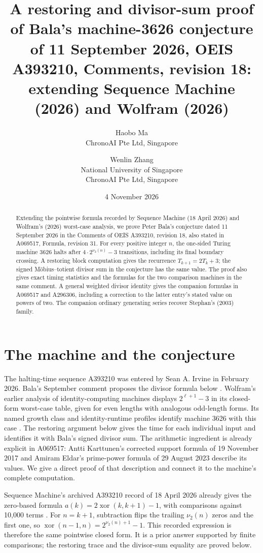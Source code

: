 \documentclass[11pt]{article}
\title{A restoring and divisor-sum proof of Bala's\newline
  machine-3626 conjecture of 11 September 2026,\newline
  OEIS A393210, Comments, revision 18:\newline
  extending Sequence Machine (2026) and Wolfram (2026)}
\author{Haobo Ma\\\small ChronoAI Pte Ltd, Singapore
  \and Wenlin Zhang\\\small National University of Singapore\\
  \small ChronoAI Pte Ltd, Singapore}
\date{4 November 2026}
\newcommand{\val}{\nu_2}
\begin{document}
\maketitle
\begin{abstract}
Extending the pointwise formula recorded by Sequence Machine (18 April 2026)
and Wolfram's (2026) worst-case analysis, we prove Peter Bala's conjecture
dated 11 September 2026 in the Comments
of OEIS A393210, revision 18, also stated in A069517, Formula, revision 31.
For every positive integer $n$, the one-sided Turing machine 3626 halts after
$4\cdot2^{\val(n)}-3$ transitions, including its final boundary crossing.
A restoring block computation gives the recurrence $T_{k+1}=2T_k+3$;
the signed M\"obius--totient divisor sum in the conjecture has the same value.
The proof also gives exact timing statistics and the formulas for the two
comparison machines in the same comment. A general weighted divisor identity
gives the companion formulas in A069517 and A296306, including a correction
to the latter entry's stated value on powers of two.
The companion ordinary generating series recover Stephan's (2003) family.
\end{abstract}

\section{The machine and the conjecture}
The halting-time sequence A393210 was entered by Sean A. Irvine in February
2026. Bala's September comment proposes the divisor formula below
\cite{halting,mobius}. Wolfram's earlier analysis of identity-computing
machines displays $2^{\ell+1}-3$ in its closed-form worst-case table,
given for even lengths with analogous odd-length forms. Its named growth
class and identity-runtime profiles identify machine 3626 with this case
\cite{wolfram}.
The restoring argument below gives the time for each individual input and
identifies it with Bala's signed divisor sum.
The arithmetic ingredient is already explicit in A069517: Antti Karttunen's
corrected support formula of 19 November 2017 and Amiram Eldar's prime-power formula of
29 August 2023 describe its values.
We give a direct proof of that description and connect it to the machine's
complete computation.

Sequence Machine's archived A393210 record of 18 April 2026 already gives
the zero-based formula $a(k)=2\operatorname{xor}(k,k+1)-1$, with comparisons
against 10,000 terms \cite{sequence-machine}. For $n=k+1$, subtraction
flips the trailing $\val(n)$ zeros and the first one, so
$\operatorname{xor}(n-1,n)=2^{\val(n)+1}-1$. This recorded expression is
therefore the same pointwise closed form. It is a prior answer supported
by finite comparisons; the restoring trace and the divisor-sum equality
are proved below.
\end{document}
